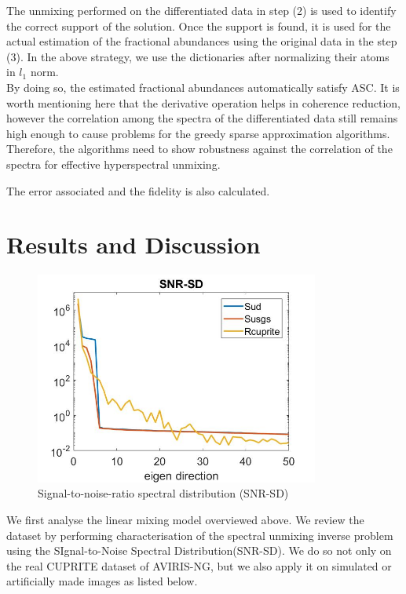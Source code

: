 \documentclass[12pt]{svproc}
\begin{document}
The  unmixing  performed  on  the  differentiated  data  in
step (2) is used to identify the correct support of the solution.
Once the support is found, it is used for the actual estimation of
the fractional abundances using the original data in the step (3).
In the above strategy, we use the dictionaries after normalizing
their atoms in $l_{1}$ norm.\\

By doing so, the estimated fractional
abundances automatically satisfy ASC. It is worth mentioning
here that the derivative operation helps in coherence reduction,
however the correlation among the spectra of the differentiated
data still remains high enough to cause problems for the greedy
sparse  approximation  algorithms.  Therefore,  the  algorithms
need to show robustness against the correlation of the spectra
for effective hyperspectral unmixing.

The error associated and the fidelity is also calculated.

\section{Results and Discussion}
\begin{figure}{}
	\centering
	\includegraphics[width=0.8\linewidth, height=7cm]{Picture5} 
	\caption{ Signal-to-noise-ratio spectral distribution (SNR-SD)  }
	\label{fig:res1}
\end{figure}
We first analyse the linear mixing model overviewed above. We review the dataset by performing characterisation of the spectral unmixing inverse problem using the SIgnal-to-Noise Spectral Distribution(SNR-SD). We do so not only on the real CUPRITE dataset of AVIRIS-NG, but we also apply it on simulated or artificially made images as listed below.\\
\end{document}

